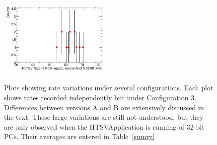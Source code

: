 \begin{figure}[!h]
  \includegraphics[width=0.49\textwidth]{figures/h_reinerThree.png}\\
  \caption{Plots showing rate variations under several configurations.
Each plot shows rates recorded independently but under Configuration 3. 
Differences between versions A and B are extensively discussed in the text. These 
large variations are still not understood, but they are only observed when 
the HTSVApplication is running of 32-bit PCs. Their averages are entered in Table~\ref{sumry}}
  \label{avs}
\end{figure}
